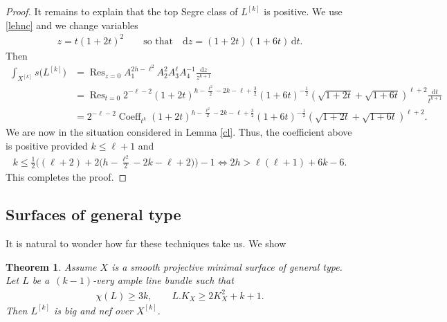 \documentclass[pdftex]{sigma}
\numberwithin{equation}{section}
\newtheorem{Theorem}{Theorem}[section]
\begin{document}
\begin{proof}
It remains to explain that the top Segre class of $L^{[k]}$ is positive. We use \eqref{lehnc} and we change variables
\begin{gather*}
z=t(1+2t)^2\qquad \text{so that}\quad \mathrm dz=(1+2t)(1+6t)\,{\mathrm dt}.
\end{gather*}
Then
\begin{align}
\int_{X^{[k]}} s\big(L^{[k]}\big)&=\operatorname{Res}_{z=0} A_1^{2h-\ell^2} A_2^2 A_3^{\ell} A_4^{-1} \frac{\mathrm dz}{z^{k+1}}\nonumber
\\
\nonumber&=
\operatorname{Res}_{t=0} 2^{-\ell-2} (1+2t)^{h-\frac{\ell^2}{2}-2k-\ell+\frac{3}{2}} (1+6t)^{-\frac{1}{2}} \left(\sqrt{1+2t}+\sqrt{1+6t}\right)^{\ell+2}\frac{\mathrm dt}{t^{k+1}}
\\
&= 2^{-\ell-2} \operatorname{Coeff}_{t^k} (1\!+2t)^{h-\frac{\ell^2}{2}-2k-\ell+\frac{3}{2}} (1\!+6t)^{-\frac{1}{2}} \left(\sqrt{1+2t}\!+\sqrt{1+6t}\right)^{\ell+2}\!.
\label{cvvv}
\end{align}
We are now in the situation considered in Lemma \ref{cl}. Thus, the coefficient above is positive provided $k\leq \ell+1$ and
\begin{gather*}
k\leq \frac{1}{2} \bigg((\ell+2)+2\bigg(h-\frac{\ell^2}{2}-2k-\ell+2\bigg)\bigg)-1\iff 2h> \ell(\ell+1)+6k-6.
\end{gather*}
This completes the proof.
\end{proof}

\subsection{Surfaces of general type} It is natural to wonder how far these techniques take us. We show

\begin{Theorem} \label{gtyp}Assume $X$ is a smooth projective minimal surface of general type. Let $L$ be a~$(k-1)$-very ample line bundle such that
\begin{gather*}
\chi(L)\geq 3k, \qquad L.K_X\geq 2K_X^2+k+1.
\end{gather*}
Then $L^{[k]}$ is big and nef over $X^{[k]}$.
\end{Theorem}
\end{document}
